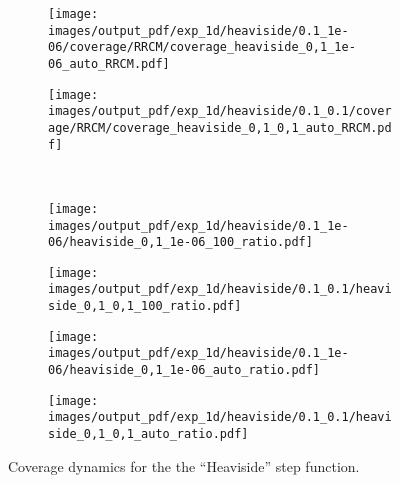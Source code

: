 \documentclass[a4paper,14pt]{extarticle}
\begin{document}
\begin{figure}
\begin{subfigure}[b]{0.25\linewidth}
  \end{subfigure}%
  \begin{subfigure}[b]{0.25\linewidth}
    \texttt{[image: images/output\_pdf/exp\_1d/heaviside/0.1\_1e-06/coverage/RRCM/coverage\_heaviside\_0,1\_1e-06\_auto\_RRCM.pdf]}
  \end{subfigure}%
  \begin{subfigure}[b]{0.25\linewidth}
    \texttt{[image: images/output\_pdf/exp\_1d/heaviside/0.1\_0.1/coverage/RRCM/coverage\_heaviside\_0,1\_0,1\_auto\_RRCM.pdf]}
  \end{subfigure}\\
  \begin{subfigure}[b]{0.25\linewidth}
    \texttt{[image: images/output\_pdf/exp\_1d/heaviside/0.1\_1e-06/heaviside\_0,1\_1e-06\_100\_ratio.pdf]}
    \caption{} \label{fig:heaviside_1d_high_noise_c1}
  \end{subfigure}%
  \begin{subfigure}[b]{0.25\linewidth}
    \texttt{[image: images/output\_pdf/exp\_1d/heaviside/0.1\_0.1/heaviside\_0,1\_0,1\_100\_ratio.pdf]}
    \caption{} \label{fig:heaviside_1d_high_noise_c2}
  \end{subfigure}%
  \begin{subfigure}[b]{0.25\linewidth}
    \texttt{[image: images/output\_pdf/exp\_1d/heaviside/0.1\_1e-06/heaviside\_0,1\_1e-06\_auto\_ratio.pdf]}
    \caption{} \label{fig:heaviside_1d_high_noise_c3}
  \end{subfigure}%
  \begin{subfigure}[b]{0.25\linewidth}
    \texttt{[image: images/output\_pdf/exp\_1d/heaviside/0.1\_0.1/heaviside\_0,1\_0,1\_auto\_ratio.pdf]}
    \caption{} \label{fig:heaviside_1d_high_noise_c4}
  \end{subfigure}%
  \caption{Coverage dynamics for the the ``Heaviside'' step function.}
  \label{fig:heaviside_1d_high_noise}
\end{figure}
\end{document}
